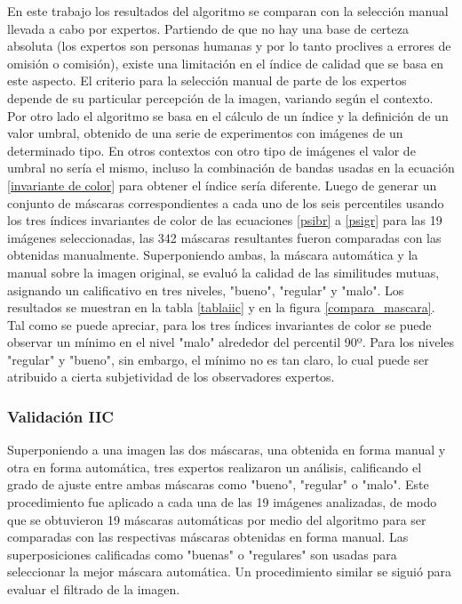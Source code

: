 En este trabajo los resultados del algoritmo se comparan con la selección manual llevada a cabo por expertos. Partiendo de que no hay una base de certeza absoluta (los expertos son personas humanas y por lo tanto proclives a errores de omisión o comisión), existe una limitación en el índice de calidad que se basa en este aspecto. El criterio para la selección manual de parte de los expertos depende de su particular percepción de la imagen, variando según el contexto. Por otro lado el algoritmo se basa en el cálculo de un índice y la definición de un valor umbral, obtenido de una serie de experimentos con imágenes de un determinado tipo. En otros contextos con otro tipo de imágenes el valor de umbral no sería el mismo, incluso la combinación de bandas usadas en la ecuación \ref{invariante de color} para obtener el índice sería diferente.
Luego de generar un conjunto de máscaras correspondientes a cada uno de los seis percentiles usando los tres índices invariantes de color de las ecuaciones \ref{psibr} a \ref{psigr} para las 19 imágenes seleccionadas, las 342 máscaras resultantes fueron comparadas con las obtenidas manualmente. Superponiendo ambas, la máscara automática y la manual sobre la imagen original, se evaluó la calidad de las similitudes mutuas, asignando un calificativo en tres niveles, "bueno", "regular" y "malo". Los resultados se muestran en la tabla \ref{tablaiic} y en la figura \ref{compara_mascara}. Tal como se puede apreciar, para los tres índices invariantes de color se puede observar un mínimo en el nivel "malo" alrededor del percentil 90º. Para los niveles "regular" y "bueno", sin embargo, el mínimo no es tan claro, lo cual puede ser atribuido a cierta subjetividad de los observadores expertos.

 

 


\subsubsection{Validación IIC} \label{Validacion}
Superponiendo a una imagen las dos máscaras, una obtenida en forma manual y otra en forma automática, tres expertos realizaron un análisis, calificando el grado de ajuste entre ambas máscaras como "bueno", "regular" o "malo". Este procedimiento fue aplicado a cada una de las 19 imágenes analizadas, de modo que se obtuvieron 19 máscaras automáticas por medio del algoritmo para ser comparadas con las respectivas máscaras obtenidas en forma manual. Las superposiciones calificadas como "buenas" o "regulares" son usadas para seleccionar la mejor máscara automática. Un procedimiento similar se siguió para evaluar el filtrado de la imagen.

